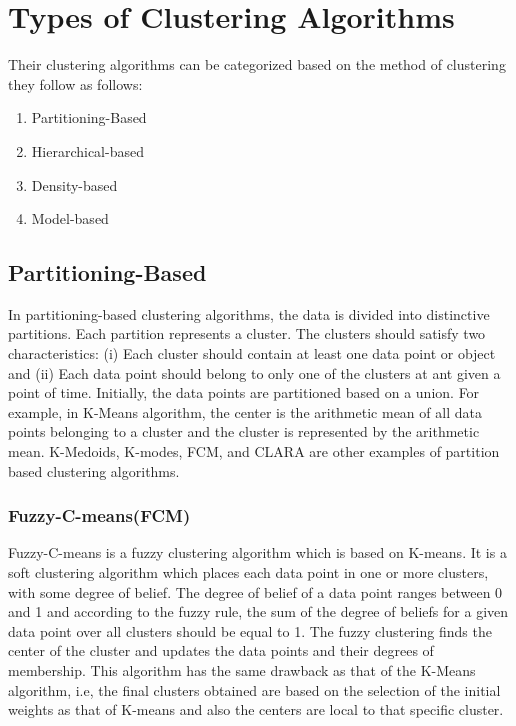 \documentclass[sigconf]{acmart}
\begin{document}
\section{Types of Clustering Algorithms}
Their clustering algorithms can be categorized based on the method of clustering they follow as follows:
\begin{enumerate}
    \item Partitioning-Based
    \item Hierarchical-based
    \item Density-based
    \item Model-based
\end{enumerate}

\subsection{Partitioning-Based}
In partitioning-based clustering algorithms, the data is divided into distinctive partitions. Each partition represents a cluster. The clusters should satisfy two characteristics: (i) Each cluster should contain at least one data point or object and (ii) Each data point should belong to only one of the clusters at ant given a point of time. Initially, the data points are partitioned based on a union. For example, in K-Means algorithm, the center is the arithmetic mean of all data points belonging to a cluster and the cluster is represented by the arithmetic mean. K-Medoids, K-modes, FCM, and CLARA are other examples of partition based clustering algorithms. 
\subsubsection{Fuzzy-C-means(FCM)}
Fuzzy-C-means is a fuzzy clustering algorithm which is based on K-means\cite{Bezdek1984}. It is a soft clustering algorithm which places each data point in one or more clusters, with some degree of belief. The degree of belief of a data point ranges between 0 and 1 and according to the fuzzy rule, the sum of the degree of beliefs for a given data point over all clusters should be equal to 1. The fuzzy clustering finds the center of the cluster and updates the data points and their degrees of membership. This algorithm has the same drawback as that of the K-Means algorithm, i.e, the final clusters obtained are based on the selection of the initial weights as that of K-means and also the centers are local to that specific cluster. 
\end{document}
